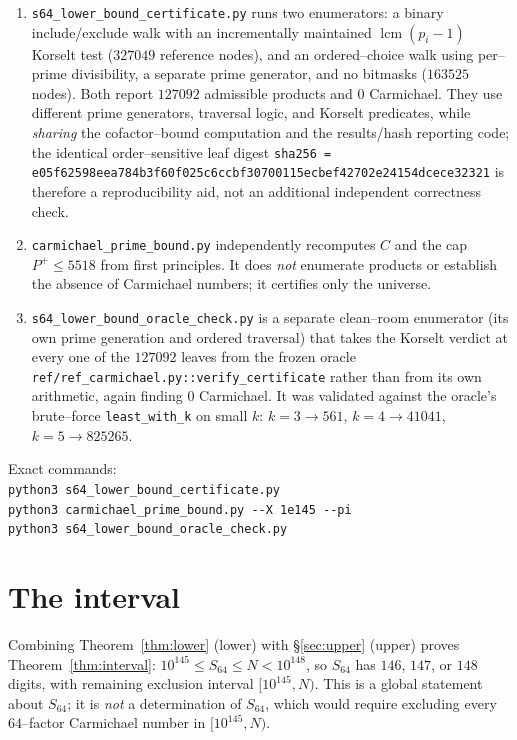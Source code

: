 \documentclass[11pt]{article}
\theoremstyle{definition}
\newcommand{\Smin}{S_{64}}
\newcommand{\Pp}{P^{+}}
\newcommand{\code}[1]{\texttt{#1}}
\begin{document}
\begin{enumerate}
\item \code{s64\_lower\_bound\_certificate.py} runs two enumerators: a binary include/exclude walk
with an incrementally maintained $\operatorname{lcm}(p_i-1)$ Korselt test ($327049$ reference
nodes), and an ordered--choice walk using per--prime divisibility, a separate prime generator, and
no bitmasks ($163525$ nodes). Both report $127092$ admissible products and $0$ Carmichael. They use
different prime generators, traversal logic, and Korselt predicates, while \emph{sharing} the
cofactor--bound computation and the results/hash reporting code; the identical order--sensitive leaf
digest \code{sha256 = e05f62598eea784b3f60f025c6ccbf30700115ecbef42702e24154dcece32321} is therefore
a reproducibility aid, not an additional independent correctness check.
\item \code{carmichael\_prime\_bound.py} independently recomputes $C$ and the cap $\Pp\le 5518$ from
first principles. It does \emph{not} enumerate products or establish the absence of Carmichael
numbers; it certifies only the universe.
\item \code{s64\_lower\_bound\_oracle\_check.py} is a separate clean--room enumerator (its own
prime generation and ordered traversal) that takes the Korselt verdict at every one of the $127092$
leaves from the frozen oracle \code{ref/ref\_carmichael.py::verify\_certificate} rather than from
its own arithmetic, again finding $0$ Carmichael. It was validated against the oracle's brute--force
\code{least\_with\_k} on small $k$: $k=3\!\to\!561$, $k=4\!\to\!41041$, $k=5\!\to\!825265$.
\end{enumerate}

\noindent Exact commands:\\
\code{python3 s64\_lower\_bound\_certificate.py}\\
\code{python3 carmichael\_prime\_bound.py -{}-X 1e145 -{}-pi}\\
\code{python3 s64\_lower\_bound\_oracle\_check.py}

\section{The interval}

Combining Theorem~\ref{thm:lower} (lower) with \S\ref{sec:upper} (upper) proves
Theorem~\ref{thm:interval}: $10^{145}\le\Smin\le N<10^{148}$, so $\Smin$ has $146$, $147$, or $148$
digits, with remaining exclusion interval $[10^{145},N)$. This is a global statement about $\Smin$;
it is \emph{not} a determination of $\Smin$, which would require excluding every $64$--factor
Carmichael number in $[10^{145},N)$.
\end{document}
